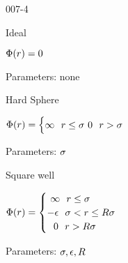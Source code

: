 \begin{mitframe}{007-4} %

    
\begin{listone}
    
    \item Ideal
    
    \begin{listtwo}
    
    	\item $\pot(\pos) = 0 $
    
    	\item Parameters: none
    
    \end{listtwo}
    
    \item Hard Sphere
    
    \begin{listtwo}

    	\item $\pot(\pos)=\begin{cases}
                    \infty ~~\pos \leq \molecrad
                    ~0 ~~ \pos > \molecrad\\
                \end{cases}$

      	\item Parameters: $\molecrad$
    
    \end{listtwo}
    
    \item Square well
    
    	\begin{listtwo}
    
    	\item $\pot(\pos)=\begin{cases}
                    ~\infty ~~\pos \leq \molecrad\\
                    -\dielec ~~\molecrad < \pos \leq \gasconst\molecrad\\
                    ~~0 ~~ \pos > \gasconst\molecrad\\
                \end{cases}$
                
      	\item Parameters: $\molecrad, \dielec, \gasconst$

        

\end{listtwo}
\end{listone}
\end{mitframe}
